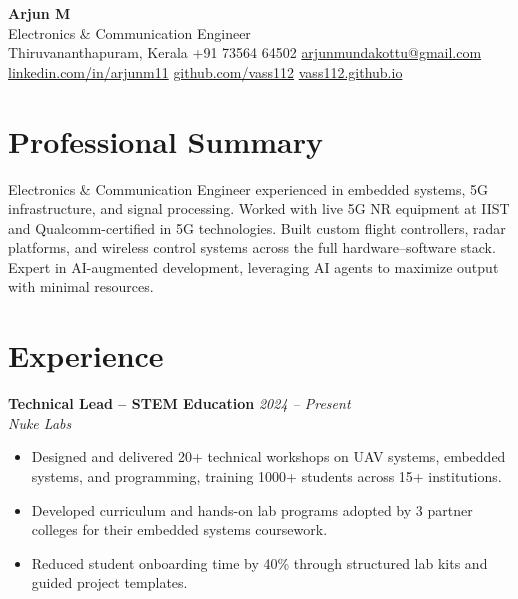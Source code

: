 \documentclass[10pt,a4paper]{article}
\newcommand{\role}[2]{\textbf{#1} \hfill \textit{#2}}
\newcommand{\org}[2]{\textit{#1} \hfill #2}
\begin{document}
\begin{center}
    {\LARGE \textbf{Arjun M}} \\[3pt]
    {\small Electronics \& Communication Engineer} \\[2pt]
    {\small \faMapMarker* \hspace{0.3em} Thiruvananthapuram, Kerala \hspace{1.2em}
     \faPhone* \hspace{0.3em} +91 73564 64502 \hspace{1.2em}
     \faEnvelope \hspace{0.3em} \href{mailto:arjunmundakottu@gmail.com}{arjunmundakottu@gmail.com}} \\[2pt]
    {\small \faLinkedin \hspace{0.3em} \href{https://linkedin.com/in/arjunm11}{linkedin.com/in/arjunm11} \hspace{1.2em}
     \faGithub \hspace{0.3em} \href{https://github.com/vass112}{github.com/vass112} \hspace{1.2em}
     \faGlobe \hspace{0.3em} \href{https://vass112.github.io}{vass112.github.io}}
\end{center}

\section*{Professional Summary}

Electronics \& Communication Engineer experienced in embedded systems, 5G infrastructure, and signal processing. Worked with live 5G NR equipment at IIST and Qualcomm-certified in 5G technologies. Built custom flight controllers, radar platforms, and wireless control systems across the full hardware--software stack. Expert in AI-augmented development, leveraging AI agents to maximize output with minimal resources.

\section*{Experience}

\role{Technical Lead -- STEM Education}{2024 -- Present} \\
\org{Nuke Labs}{}
\begin{itemize}
    \item Designed and delivered 20+ technical workshops on UAV systems, embedded systems, and programming, training 1000+ students across 15+ institutions.
    \item Developed curriculum and hands-on lab programs adopted by 3 partner colleges for their embedded systems coursework.
    \item Reduced student onboarding time by 40\% through structured lab kits and guided project templates.
\end{itemize}
\end{document}
